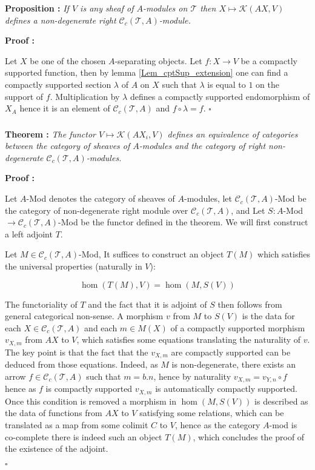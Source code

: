 \documentclass[a4paper]{article}
\newcommand{\Tcal}{\mathcal{T}}
\newcommand{\Kcal}{\mathcal{K}}
\newcommand{\Ccal}{\mathcal{C}}
\newcommand{\block}[1]
{

\par \subsubsection{} #1

\bigskip}
\newcommand{\Th}[1]
	{
	\bigskip	
	\textbf{Theorem : }{\itshape #1}
		
	\bigskip
	}
\newcommand{\Prop}[1]
	{

	\bigskip
	
	\textbf{Proposition : }{\itshape #1}
		
	\bigskip
	
	}
\newcommand{\Dem}[1]{
	
	\smallskip
	
	\textbf{Proof : } \par
	 {#1} $\square$
	 
	 \bigskip
}
\begin{document}
{\Prop{If $V$ is any sheaf of $A$-modules on $\Tcal$ then $X \mapsto \Kcal(A X, V)$ defines a non-degenerate right $\Ccal_c(\Tcal,A)$-module. }

\Dem{Let $X$ be one of the chosen $A$-separating objects. Let $f :X \rightarrow V$ be a compactly supported function, then by lemma \ref{Lem_cptSup_extension} one can find a compactly supported section $\lambda$ of $A$ on $X$ such that $\lambda$ is equal to $1$ on the support of $f$. Multiplication by $\lambda$ defines a compactly supported endomorphism of $X_A$ hence it is an element of $\Ccal_c(\Tcal,A)$ and $f \circ  \lambda = f$.}

}


\block{\Th{The functor $V \mapsto \Kcal(A X_i,V)$ defines an equivalence of categories between the category of sheaves of $A$-modules and the category of right non-degenerate $\Ccal_c(\Tcal,A)$-modules.}

\Dem{Let $A$-Mod denotes the category of sheaves of $A$-modules, let $\Ccal_c(\Tcal,A)$-Mod be the category of non-degenerate right module over $\Ccal_c(\Tcal,A)$, and  Let $S: A$-Mod $ \rightarrow \Ccal_c(\Tcal,A)$-Mod be the functor defined in the theorem. We will first construct a left adjoint $T$.


Let $M \in \Ccal_c(\Tcal,A)$-Mod, It suffices to construct an object $T(M)$ which satisfies the universal properties (naturally in $V$):

\[ \hom(T(M),V) = \hom(M,S(V)) \]

The functoriality of $T$ and the fact that it is adjoint of $S$ then follows from general categorical non-sense. A morphism $v$ from $M$ to $S(V)$ is the data for each $ X \in \Ccal_c(\Tcal,A)$ and each $m \in M(X)$ of a compactly supported morphism $v_{X,m}$ from $A X$ to $V$, which satisfies some equations translating the naturality of $v$. The key point is that the fact that the $v_{X,m}$ are compactly supported can be deduced from those equations. Indeed, as $M$ is non-degenerate, there exists an arrow $f \in \Ccal_{c} (\Tcal,A)$ such that $m=b.n$, hence by naturality $v_{X,m} = v_{Y,n} \circ f$ hence as $f$ is compactly supported $v_{X,m}$ is automatically compactly supported. Once this condition is removed a morphism in $\hom(M,S(V))$ is described as the data of functions from $A X$ to $V$ satisfying some relations, which can be translated as a map from some colimit $C$ to $V$, hence as the category $A$-mod is co-complete there is indeed such an object $T(M)$, which concludes the proof of the existence of the adjoint.

}}
\end{document}
